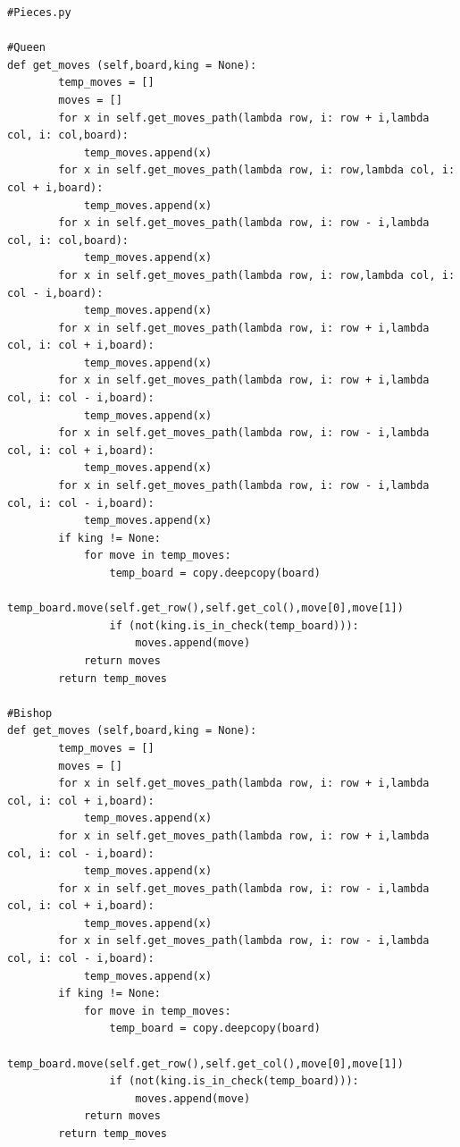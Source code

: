 \documentclass[english]{article}
\begin{document}
\begin{lstlisting}
#Pieces.py

#Queen
def get_moves (self,board,king = None):
        temp_moves = []
        moves = []
        for x in self.get_moves_path(lambda row, i: row + i,lambda col, i: col,board):
            temp_moves.append(x)
        for x in self.get_moves_path(lambda row, i: row,lambda col, i: col + i,board):
            temp_moves.append(x)
        for x in self.get_moves_path(lambda row, i: row - i,lambda col, i: col,board):
            temp_moves.append(x)
        for x in self.get_moves_path(lambda row, i: row,lambda col, i: col - i,board):
            temp_moves.append(x)
        for x in self.get_moves_path(lambda row, i: row + i,lambda col, i: col + i,board):
            temp_moves.append(x)
        for x in self.get_moves_path(lambda row, i: row + i,lambda col, i: col - i,board):
            temp_moves.append(x)
        for x in self.get_moves_path(lambda row, i: row - i,lambda col, i: col + i,board):
            temp_moves.append(x)
        for x in self.get_moves_path(lambda row, i: row - i,lambda col, i: col - i,board):
            temp_moves.append(x)
        if king != None:
            for move in temp_moves:
                temp_board = copy.deepcopy(board)
                temp_board.move(self.get_row(),self.get_col(),move[0],move[1])
                if (not(king.is_in_check(temp_board))):
                    moves.append(move)
            return moves
        return temp_moves
        
#Bishop
def get_moves (self,board,king = None):
        temp_moves = []
        moves = []
        for x in self.get_moves_path(lambda row, i: row + i,lambda col, i: col + i,board):
            temp_moves.append(x)
        for x in self.get_moves_path(lambda row, i: row + i,lambda col, i: col - i,board):
            temp_moves.append(x)
        for x in self.get_moves_path(lambda row, i: row - i,lambda col, i: col + i,board):
            temp_moves.append(x)
        for x in self.get_moves_path(lambda row, i: row - i,lambda col, i: col - i,board):
            temp_moves.append(x)
        if king != None:
            for move in temp_moves:
                temp_board = copy.deepcopy(board)
                temp_board.move(self.get_row(),self.get_col(),move[0],move[1])
                if (not(king.is_in_check(temp_board))):
                    moves.append(move)
            return moves
        return temp_moves
        

\end{lstlisting}
\end{document}
